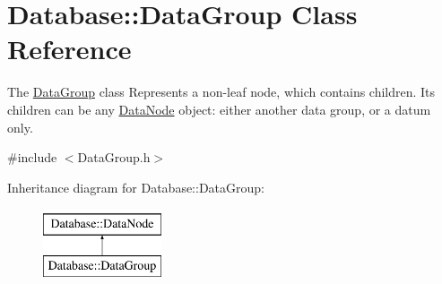\hypertarget{classDatabase_1_1DataGroup}{}\section{Database\+:\+:Data\+Group Class Reference}
\label{classDatabase_1_1DataGroup}


The \hyperlink{classDatabase_1_1DataGroup}{Data\+Group} class Represents a non-\/leaf node, which contains children. Its children can be any \hyperlink{classDatabase_1_1DataNode}{Data\+Node} object\+: either another data group, or a datum only.  




{\ttfamily \#include $<$Data\+Group.\+h$>$}

Inheritance diagram for Database\+:\+:Data\+Group\+:\begin{figure}[H]
\begin{center}
\leavevmode
\includegraphics[height=2.000000cm]{classDatabase_1_1DataGroup}
\end{center}
\end{figure}
